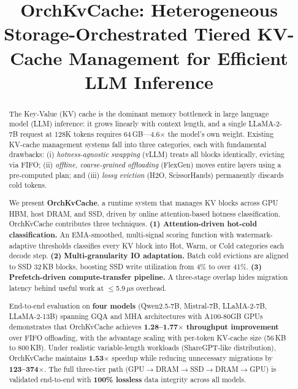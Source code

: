\documentclass[conference]{IEEEtran}
\begin{document}
\title{OrchKvCache: Heterogeneous Storage-Orchestrated Tiered KV-Cache Management for Efficient LLM Inference}

\author{
}

\maketitle

\begin{abstract}
The Key-Value (KV) cache is the dominant memory bottleneck in large language model (LLM) inference: it grows linearly with context length, and a single LLaMA-2-7B request at 128K tokens requires 64\,GB---4.6$\times$ the model's own weight. Existing KV-cache management systems fall into three categories, each with fundamental drawbacks: (i) \emph{hotness-agnostic swapping} (vLLM) treats all blocks identically, evicting via FIFO; (ii) \emph{offline, coarse-grained offloading} (FlexGen) moves entire layers using a pre-computed plan; and (iii) \emph{lossy eviction} (H2O, ScissorHands) permanently discards cold tokens.

We present \textbf{OrchKvCache}, a runtime system that manages KV blocks across GPU HBM, host DRAM, and SSD, driven by online attention-based hotness classification. OrchKvCache contributes three techniques. \textbf{(1) Attention-driven hot-cold classification.} An EMA-smoothed, multi-signal scoring function with watermark-adaptive thresholds classifies every KV block into Hot, Warm, or Cold categories each decode step. \textbf{(2) Multi-granularity IO adaptation.} Batch cold evictions are aligned to SSD 32\,KB blocks, boosting SSD write utilization from 4\% to over 41\%. \textbf{(3) Prefetch-driven compute-transfer pipeline.} A three-stage overlap hides migration latency behind useful work at $\leq$5.9\,$\mu$s overhead.

End-to-end evaluation on \textbf{four models} (Qwen2.5-7B, Mistral-7B, LLaMA-2-7B, LLaMA-2-13B) spanning GQA and MHA architectures with A100-80GB GPUs demonstrates that OrchKvCache achieves \textbf{1.28--1.77$\times$ throughput improvement} over FIFO offloading, with the advantage scaling with per-token KV-cache size (56\,KB to 800\,KB). Under realistic variable-length workloads (ShareGPT-like distribution), OrchKvCache maintains \textbf{1.53$\times$} speedup while reducing unnecessary migrations by \textbf{123--374$\times$}. The full three-tier path (GPU$\to$DRAM$\to$SSD$\to$DRAM$\to$GPU) is validated end-to-end with \textbf{100\% lossless} data integrity across all models.
\end{abstract}
\end{document}

